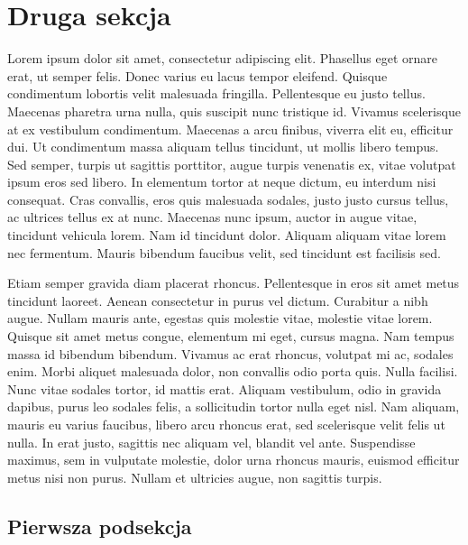 \section{Druga sekcja}

Lorem ipsum dolor sit amet, consectetur adipiscing elit. Phasellus eget ornare
erat, ut semper felis. Donec varius eu lacus tempor eleifend. Quisque
condimentum lobortis velit malesuada fringilla. Pellentesque eu justo tellus.
Maecenas pharetra urna nulla, quis suscipit nunc tristique id. Vivamus
scelerisque at ex vestibulum condimentum. Maecenas a arcu finibus, viverra elit
eu, efficitur dui. Ut condimentum massa aliquam tellus tincidunt, ut mollis
libero tempus. Sed semper, turpis ut sagittis porttitor, augue turpis venenatis
ex, vitae volutpat ipsum eros sed libero. In elementum tortor at neque dictum,
eu interdum nisi consequat. Cras convallis, eros quis malesuada sodales, justo
justo cursus tellus, ac ultrices tellus ex at nunc. Maecenas nunc ipsum, auctor
in augue vitae, tincidunt vehicula lorem. Nam id tincidunt dolor. Aliquam
aliquam vitae lorem nec fermentum. Mauris bibendum faucibus velit, sed tincidunt
est facilisis sed.

Etiam semper gravida diam placerat rhoncus. Pellentesque in eros sit amet metus
tincidunt laoreet. Aenean consectetur in purus vel dictum. Curabitur a nibh
augue. Nullam mauris ante, egestas quis molestie vitae, molestie vitae lorem.
Quisque sit amet metus congue, elementum mi eget, cursus magna. Nam tempus massa
id bibendum bibendum. Vivamus ac erat rhoncus, volutpat mi ac, sodales enim.
Morbi aliquet malesuada dolor, non convallis odio porta quis. Nulla facilisi.
Nunc vitae sodales tortor, id mattis erat. Aliquam vestibulum, odio in gravida
dapibus, purus leo sodales felis, a sollicitudin tortor nulla eget nisl. Nam
aliquam, mauris eu varius faucibus, libero arcu rhoncus erat, sed scelerisque
velit felis ut nulla. In erat justo, sagittis nec aliquam vel, blandit vel
ante. Suspendisse maximus, sem in vulputate molestie, dolor urna rhoncus
mauris, euismod efficitur metus nisi non purus. Nullam et ultricies augue, non
sagittis turpis.

\subsection{Pierwsza podsekcja}

